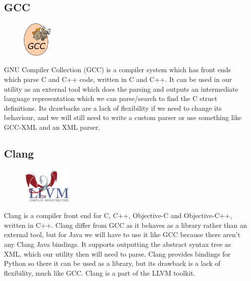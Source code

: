 \subsection{GCC}
\begin{figure}
	\begin{center}
	\vspace{-30pt}
		\includegraphics[width=1.5cm]{./planning/img/gcc_logo}
	\vspace{-30pt}
	\end{center}
\end{figure}
GNU Compiler Collection (GCC) is a compiler system which has front ends which
parse C and C++ code, written in C and C++. It can be used in our utility as
an external tool which does the parsing and outputs an intermediate language
representation which we can parse/search to find the C struct definitions. Its
drawbacks are a lack of flexibility if we need to change its behaviour, and we
will still need to write a custom parser or use something like GCC-XML and an
XML parser. 

\subsection{Clang}
\begin{figure}
	\begin{center}
	\vspace{-30pt}
		\includegraphics[width=2.5cm]{./planning/img/llvm_logo}
	\vspace{-30pt}
	\end{center}
\end{figure}
Clang is a compiler front end for C, C++, Objective-C and Objective-C++,
written in C++. Clang differ from GCC as it behaves as a library rather than an
external tool, but for Java we will have to use it like GCC because there
aren’t any Clang Java bindings. It supports outputting the abstract syntax
tree as XML, which our utility then will need to parse. Clang provides bindings
for Python so there it can be used as a library, but its drawback is a lack of
flexibility, much like GCC. Clang is a part of the LLVM toolkit.


